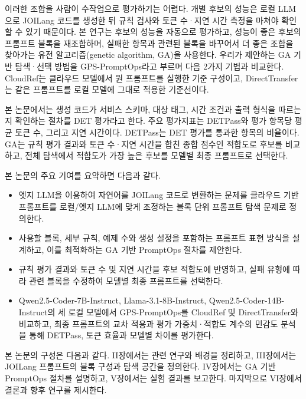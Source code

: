 \documentclass[10pt,twocolumn]{article}
\newcommand{\rev}[1]{{\color{revisionblue}#1}}
\newenvironment{revision}{\begingroup\color{revisionblue}}{\endgroup}
\begin{document}
이러한 조합을 사람이 수작업으로 평가하기는 어렵다. 개별 후보의 성능은 로컬 LLM으로 JOILang 코드를 생성한 뒤 규칙 검사와 토큰 수·지연 시간 측정을 마쳐야 확인할 수 있기 때문이다. 본 연구는 후보의 성능을 자동으로 평가하고, 성능이 좋은 후보의 프롬프트 블록을 재조합하며, 실패한 항목과 관련된 블록을 바꾸어서 더 좋은 조합을 찾아가는 유전 알고리즘(genetic algorithm, GA)을 사용한다.
\begin{revision}
우리가 제안하는 GA 기반 탐색·선택 방법을 GPS-PromptOps라고 부르며 다음 2가지 기법과 비교한다.
CloudRef는 클라우드 모델에서 원 프롬프트를 실행한 기준 구성이고, DirectTransfer는 같은 프롬프트를 로컬 모델에 그대로 적용한 기준선이다.

본 논문에서는 생성 코드가 서비스 스키마, 대상 태그, 시간 조건과 출력 형식을 따르는지 확인하는 절차를 DET 평가라고 한다. 주요 평가지표는 DETPass와 평가 항목당 평균 토큰 수, 그리고 지연 시간이다. DETPass는 DET 평가를 통과한 항목의 비율이다. GA는 규칙 평가 결과와 토큰 수·지연 시간을 합친 종합 점수인 적합도로 후보를 비교하고, 전체 탐색에서 적합도가 가장 높은 후보를 모델별 최종 프롬프트로 선택한다.
\end{revision}

본 논문의 주요 기여를 요약하면 다음과 같다.
\begin{itemize}[leftmargin=1.4em, itemsep=0.2em, parsep=0pt, topsep=0.3em]
\item 엣지 LLM을 이용하여 자연어를 JOILang 코드로 변환하는 문제를 클라우드 기반 프롬프트를 로컬/엣지 LLM에 맞게 조정하는 블록 단위 프롬프트 탐색 문제로 정의한다.
\item \rev{사용할 블록, 세부 규칙, 예제 수와 생성 설정을 포함하는 프롬프트 표현 방식을 설계하고, 이를 최적화하는 GA 기반 PromptOps 절차를 제안한다.}
\item \rev{규칙 평가 결과와 토큰 수 및 지연 시간을 후보 적합도에 반영하고, 실패 유형에 따라 관련 블록을 수정하여 모델별 최종 프롬프트를 선택한다.}
\item \rev{Qwen2.5-Coder-7B-Instruct, Llama-3.1-8B-Instruct, Qwen2.5-Coder-14B-Instruct의 세 로컬 모델에서 GPS-PromptOps를 CloudRef 및 DirectTransfer와 비교하고, 최종 프롬프트의 교차 적용과 평가 가중치·적합도 계수의 민감도 분석을 통해 DETPass, 토큰 효율과 모델별 차이를 평가한다.}
\end{itemize}

본 논문의 구성은 다음과 같다. II장에서는 관련 연구와 배경을 정리하고, III장에서는 JOILang 프롬프트의 블록 구성과 탐색 공간을 정의한다. IV장에서는 GA 기반 PromptOps 절차를 설명하고, V장에서는 실험 결과를 보고한다. 마지막으로 VI장에서 결론과 향후 연구를 제시한다.
\end{document}
